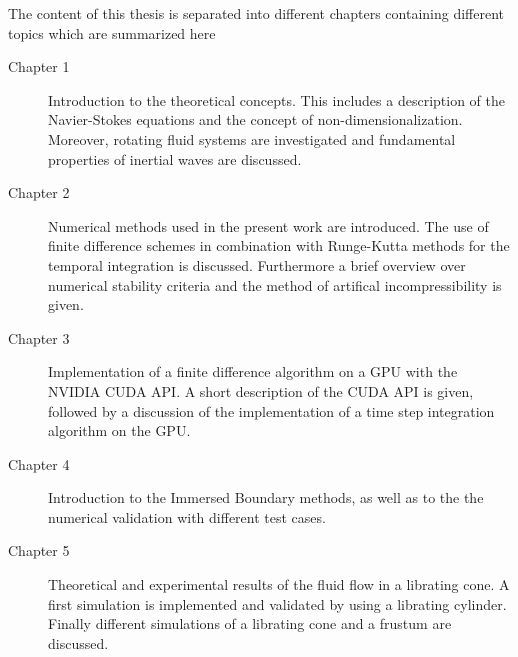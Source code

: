 The content of this thesis is separated into different chapters containing different topics which are summarized here

\begin{description}
\item[Chapter 1] Introduction to the theoretical concepts. This includes a description of the Navier-Stokes equations and
                 the concept of non-dimensionalization. Moreover, rotating fluid systems are investigated and
                 fundamental properties of inertial waves are discussed.

\item[Chapter 2] Numerical methods used in the present work are introduced.
                 The use of finite difference schemes in combination with Runge-Kutta methods for the temporal integration is discussed.
                 Furthermore a brief overview over numerical stability criteria and the method of artifical incompressibility is given.

\item[Chapter 3] Implementation of a finite difference algorithm on a GPU with the NVIDIA CUDA API.
                 A short description of the CUDA API is given, followed by a discussion of the implementation of
                 a time step integration algorithm on the GPU.

\item[Chapter 4] Introduction to the Immersed Boundary methods, as well as to the
                 the numerical validation with different test cases.

\item[Chapter 5] Theoretical and experimental results of the fluid flow in a librating cone.
                 A first simulation is implemented and validated by using a librating cylinder.
                 Finally different  simulations of a librating cone and a frustum are discussed.

\end{description}

%












